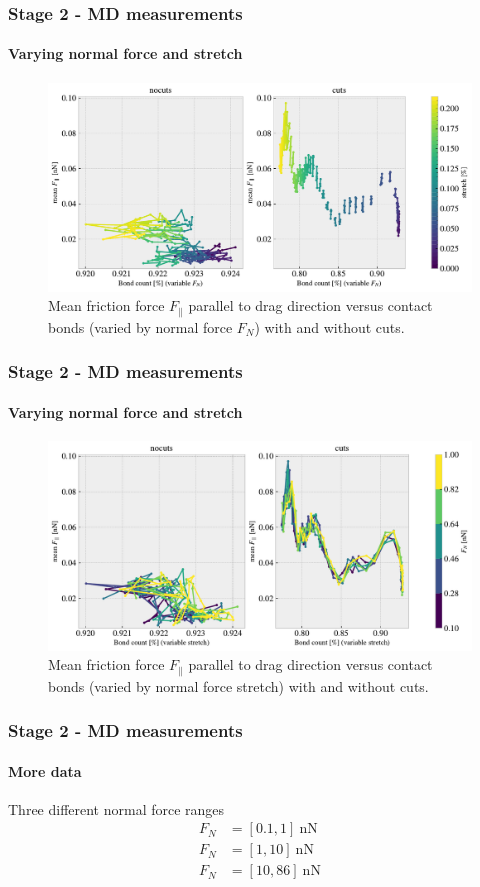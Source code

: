 \documentclass[
	10pt, %
]{beamer}
\begin{document}
\begin{frame}
	\frametitle{Stage 2 - MD measurements}
	\framesubtitle{Varying normal force and stretch}
	\begin{figure}
		\includegraphics[width=\linewidth]{figures/multi_lowFN5.pdf}
		\caption{Mean friction force $F_{\parallel}$ parallel to drag direction versus contact bonds (varied by normal force $F_N$) with and without cuts.}
	\end{figure}	
\end{frame}

\begin{frame}
	\frametitle{Stage 2 - MD measurements}
	\framesubtitle{Varying normal force and stretch}
	\begin{figure}
		\includegraphics[width=\linewidth]{figures/multi_lowFN6.pdf}
		\caption{Mean friction force $F_{\parallel}$ parallel to drag direction versus contact bonds (varied by normal force stretch) with and without cuts.}
	\end{figure}	
\end{frame}



\begin{frame}
	\frametitle{Stage 2 - MD measurements}
	\framesubtitle{More data}

	Three different normal force ranges 
	\begin{align*}
		F_N &= [0.1, 1]\ \text{nN} \\
		F_N &= [1, 10]\ \text{nN} \\
		F_N &= [10, 86]\ \text{nN}
	\end{align*}

\end{frame}
\end{document}
